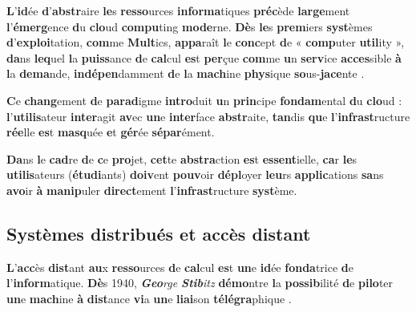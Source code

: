 \documentclass{rapportClass} %
\begin{document}
\textbf{L}’\textbf{id}ée \textbf{d}’\textbf{abstr}aire \textbf{le}s \textbf{resso}urces \textbf{informa}tiques \textbf{préc}ède \textbf{large}ment
\textbf{l}’\textbf{émerg}ence \textbf{d}u \textbf{clo}ud \textbf{compu}ting \textbf{mode}rne. \textbf{Dè}s \textbf{le}s \textbf{prem}iers \textbf{syst}èmes
\textbf{d}’\textbf{exploi}tation, \textbf{com}me \textbf{Mult}ics, \textbf{appa}raît \textbf{l}e \textbf{conc}ept \textbf{d}e « \textbf{comp}uter
\textbf{util}ity », \textbf{da}ns \textbf{leq}uel \textbf{l}a \textbf{puiss}ance \textbf{d}e \textbf{cal}cul \textbf{es}t \textbf{per}çue \textbf{com}me \textbf{u}n
\textbf{serv}ice \textbf{acces}sible \textbf{à} \textbf{l}a \textbf{dema}nde, \textbf{indépen}damment \textbf{d}e \textbf{l}a \textbf{mach}ine
\textbf{phys}ique \textbf{so}us-\textbf{jace}nte \cite{Multics1965}.

\textbf{C}e \textbf{chang}ement \textbf{d}e \textbf{parad}igme \textbf{intro}duit \textbf{u}n \textbf{prin}cipe \textbf{fondam}ental \textbf{d}u \textbf{clo}ud :
\textbf{l}’\textbf{utilis}ateur \textbf{inter}agit \textbf{av}ec \textbf{un}e \textbf{inter}face \textbf{abstr}aite, \textbf{tan}dis \textbf{qu}e
\textbf{l}’\textbf{infrast}ructure \textbf{rée}lle \textbf{es}t \textbf{masq}uée \textbf{e}t \textbf{gér}ée \textbf{sépar}ément.

\textbf{Da}ns \textbf{l}e \textbf{cad}re \textbf{d}e \textbf{c}e \textbf{pro}jet, \textbf{cet}te \textbf{abstra}ction \textbf{es}t \textbf{essent}ielle, \textbf{ca}r \textbf{le}s
\textbf{utilis}ateurs (\textbf{étudi}ants) \textbf{doiv}ent \textbf{pouv}oir \textbf{dépl}oyer \textbf{leu}rs \textbf{applic}ations
\textbf{sa}ns \textbf{avo}ir \textbf{à} \textbf{manip}uler \textbf{direct}ement \textbf{l}’\textbf{infrast}ructure \textbf{syst}ème.

\subsection{Systèmes distribués et accès distant}

\textbf{L}’\textbf{acc}ès \textbf{dist}ant \textbf{au}x \textbf{resso}urces \textbf{d}e \textbf{cal}cul \textbf{es}t \textbf{un}e \textbf{id}ée \textbf{fonda}trice \textbf{d}e
\textbf{l}’\textbf{inform}atique. \textbf{Dè}s 1940, \textit{\textbf{Geo}rge \textbf{Stib}itz} \textbf{démo}ntre \textbf{l}a \textbf{possib}ilité
\textbf{d}e \textbf{pilo}ter \textbf{un}e \textbf{mach}ine \textbf{à} \textbf{dist}ance \textbf{vi}a \textbf{un}e \textbf{liai}son \textbf{télégra}phique
\cite{Stibitz2012}.
\end{document}
